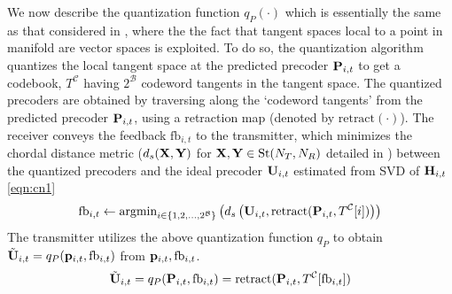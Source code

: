 \documentclass[conference]{IEEEtran}
\begin{document}
{We now describe the quantization function $q_P(\cdot)$ which is
essentially the same as that considered in \cite{6891198}, where the
the fact that tangent spaces local to a point in manifold are vector
spaces is exploited. To do so, the quantization algorithm quantizes the local tangent space at the predicted precoder ${\bf P}_{i,t}$ to get a codebook, $T^\mathcal{C}$ having $2^{\mathcal{B}}$ codeword tangents in the tangent space. The quantized precoders are obtained by traversing along the `codeword tangents' from the predicted precoder ${\bf P}_{i,t}$, using a retraction map (denoted by $\text{retract}(\cdot)$). The receiver conveys the feedback $\text{fb}_{i,t}$ to the transmitter, which minimizes the chordal distance metric ($d_s({\bf X},{\bf Y})$ for ${\bf X},{\bf Y} \in \text{St}(N_T,N_R)$ detailed in \cite{6891198}) between the quantized precoders and the ideal precoder ${\bf U}_{i,t}$ estimated from SVD of ${\bf H}_{i,t}$ \eqref{eqn:cn1}
 \begin{equation}
\label{eqn:cn1}
\text{fb}_{i,t} \gets \text{argmin}_{i \in \{1,2,\ldots,2^{\mathcal{B}}\}}\left (d_s\left (\bU_{i,t},\text{retract}(\bP_{i,t},T^\mathcal{C}[i])\right ) \right)
\end{equation}
The transmitter utilizes the above quantization function $q_P$ to obtain $\tilde{{\bf U}}_{i,t}=q_P({\bf p}_{i,t},\text{fb}_{i,t})$ from ${\bf p}_{i,t},\text{fb}_{i,t}$.
\begin{equation}
\tilde{\bU}_{i,t}=q_P(\bP_{i,t},\text{fb}_{i,t})=\text{retract}(\bP_{i,t},T^\mathcal{C}[\text{fb}_{i,t}])
\label{eqn:cn2}
\end{equation}

}
\end{document}
